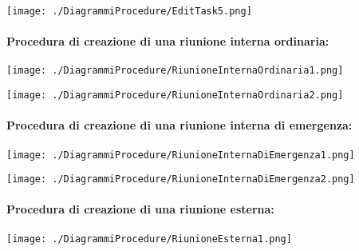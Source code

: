 \begin{center}
	\texttt{[image: ./DiagrammiProcedure/EditTask5.png]}
\end{center}

\paragraph{Procedura di creazione di una riunione interna ordinaria:}

\begin{center}
	\texttt{[image: ./DiagrammiProcedure/RiunioneInternaOrdinaria1.png]}
\end{center}

\begin{center}
	\texttt{[image: ./DiagrammiProcedure/RiunioneInternaOrdinaria2.png]}
\end{center}

\paragraph{Procedura di creazione di una riunione interna di emergenza:}

\begin{center}
	\texttt{[image: ./DiagrammiProcedure/RiunioneInternaDiEmergenza1.png]}
\end{center}

\begin{center}
	\texttt{[image: ./DiagrammiProcedure/RiunioneInternaDiEmergenza2.png]}
\end{center}

\paragraph{Procedura di creazione di una riunione esterna:}

\begin{center}
	\texttt{[image: ./DiagrammiProcedure/RiunioneEsterna1.png]}
\end{center}

